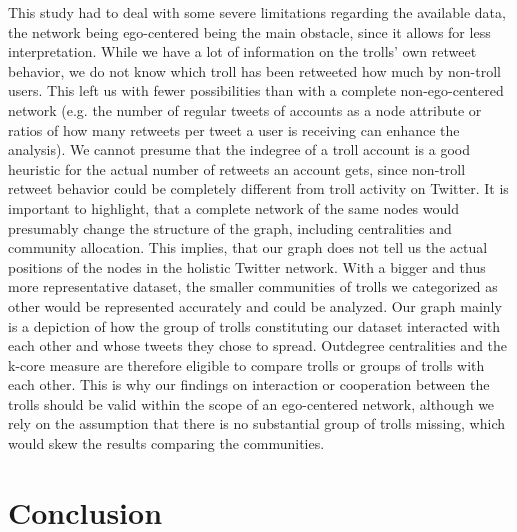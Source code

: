 \documentclass[12pt, titlepage=true, toc=bib]{scrartcl}
\begin{document}
This study had to deal with some severe limitations regarding the available data, the network being ego-centered being the main obstacle, since it allows for less interpretation. While we have a lot of information on the trolls' own retweet behavior, we do not know which troll has been retweeted how much by non-troll users. This left us with fewer possibilities than with a complete non-ego-centered network (e.g. the number of regular tweets of accounts as a node attribute or ratios of how many retweets per tweet a user is receiving can enhance the analysis). We cannot presume that the indegree of a troll account is a good heuristic for the actual number of retweets an account gets, since non-troll retweet behavior could be completely different from troll activity on Twitter. It is important to highlight, that a complete network of the same nodes would presumably change the structure of the graph, including centralities and community allocation. This implies, that our graph does not tell us the actual positions of the nodes in the holistic Twitter network. With a bigger and thus more representative dataset, the smaller communities of trolls we categorized as other would be represented accurately and could be analyzed. Our graph mainly is a depiction of how the group of trolls constituting our dataset interacted with each other and whose tweets they chose to spread. Outdegree centralities and the k-core measure are therefore eligible to compare trolls or groups of trolls with each other. This is why our findings on interaction or cooperation between the trolls should be valid within the scope of an ego-centered network, although we rely on the assumption that there is no substantial group of trolls missing, which would skew the results comparing the communities.


\section{Conclusion}
\end{document}
